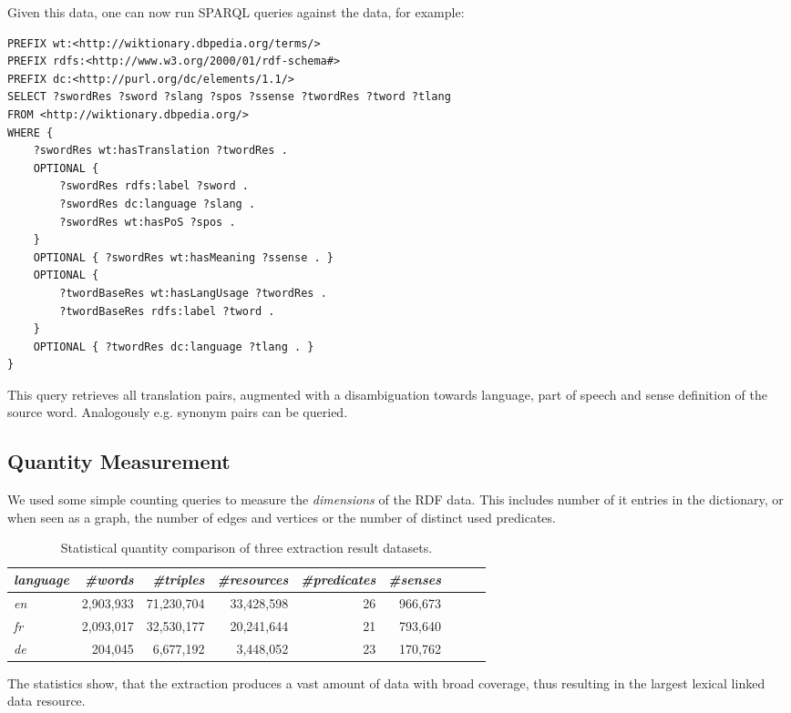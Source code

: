 Given this data, one can now run SPARQL queries against the data, for example:
\begin{lstlisting}[style=sparql]
PREFIX wt:<http://wiktionary.dbpedia.org/terms/>
PREFIX rdfs:<http://www.w3.org/2000/01/rdf-schema#>
PREFIX dc:<http://purl.org/dc/elements/1.1/>
SELECT ?swordRes ?sword ?slang ?spos ?ssense ?twordRes ?tword ?tlang
FROM <http://wiktionary.dbpedia.org/>
WHERE {
    ?swordRes wt:hasTranslation ?twordRes .
    OPTIONAL {
        ?swordRes rdfs:label ?sword .
        ?swordRes dc:language ?slang .
        ?swordRes wt:hasPoS ?spos .
    }
    OPTIONAL { ?swordRes wt:hasMeaning ?ssense . }
    OPTIONAL { 
        ?twordBaseRes wt:hasLangUsage ?twordRes . 
        ?twordBaseRes rdfs:label ?tword .
    }
    OPTIONAL { ?twordRes dc:language ?tlang . }
}
\end{lstlisting}
This query retrieves all translation pairs, augmented with a disambiguation towards language, part of speech and sense definition of the source word. Analogously e.g. synonym pairs can be queried.

\subsection{Quantity Measurement}
We used some simple counting queries to measure the \textit{dimensions} of the RDF data. This includes number of it entries in the dictionary, or when seen as a graph, the number of edges and vertices or the number of distinct used predicates. 
\begin{table}[h!]
\centering
\caption{Statistical quantity comparison of three \wik extraction result datasets.}
\begin{tabular}{|l|r|r|r|r|r|r|r|r|}
\hline \emph{language} & \emph{\#words} & \emph{\#triples} & \emph{\#resources}  & \emph{\#predicates} & \emph{\#senses} \\ 
\hline \hline \textit{en} & 2,903,933 & 71,230,704 & 33,428,598 & 26 & 966,673 \\ 
\hline \textit{fr} & 2,093,017 & 32,530,177 & 20,241,644 & 21 & 793,640 \\ 
\hline \textit{de} & 204,045 & 6,677,192 & 3,448,052 & 23 & 170,762 \\ 
\hline 
\end{tabular}
\end{table}

The statistics show, that the extraction produces a vast amount of data with broad coverage, thus resulting in the largest lexical linked data resource. 


